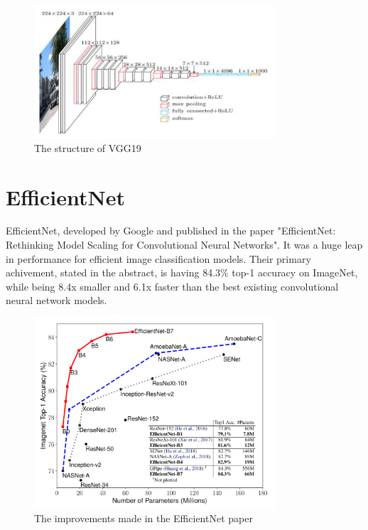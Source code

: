 \documentclass[]{final_report}
\begin{document}
\begin{figure}[ht!]
  \centering
  \includegraphics[width=0.8\textwidth]{images/VGG19-architecture.png}
  \caption{The structure of VGG19\cite{Simonyan15}}
  \label{fig:vgg19-structure}
\end{figure}


\section{EfficientNet}

EfficientNet, developed by Google and published in the paper "EfficientNet: Rethinking Model Scaling for Convolutional Neural Networks". It was a huge leap in performance for efficient image classification models. Their primary achivement, stated in the abstract, is having 84.3\% top-1 accuracy on ImageNet, while being 8.4x smaller and 6.1x faster than the best existing convolutional neural network models.\cite{tan2020efficientnet}

\begin{figure}[ht!]
  \centering
  \includegraphics[width=0.8\textwidth]{images/EfficientNetComparison.PNG}
  \caption{The improvements made in the EfficientNet paper\cite{tan2020efficientnet}}
  \label{fig:efficientnet-comparison}
\end{figure}
\end{document}

